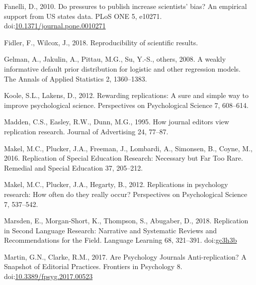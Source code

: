 \documentclass[]{elsarticle} %
\newlength{\cslhangindent}
\newlength{\cslentryspacingunit} %
\newenvironment{CSLReferences}[2] %
 {%
  \setlength{\parindent}{0pt}
  \ifodd #1
  \let\oldpar\par
  \def\par{\hangindent=\cslhangindent\oldpar}
  \fi
  \setlength{\parskip}{#2\cslentryspacingunit}
 }%
 {}
\begin{document}
\begin{CSLReferences}{1}{0}
\leavevmode{}%
Fanelli, D., 2010. Do pressures to publish increase scientists' bias? An
empirical support from US states data. PLoS ONE 5, e10271.
doi:\href{https://doi.org/10.1371/journal.pone.0010271}{10.1371/journal.pone.0010271}

\leavevmode{}%
Fidler, F., Wilcox, J., 2018. Reproducibility of scientific results.

\leavevmode{}%
Gelman, A., Jakulin, A., Pittau, M.G., Su, Y.-S., others, 2008. A weakly
informative default prior distribution for logistic and other regression
models. The Annals of Applied Statistics 2, 1360--1383.

\leavevmode{}%
Koole, S.L., Lakens, D., 2012. Rewarding replications: {A} sure and
simple way to improve psychological science. Perspectives on
Psychological Science 7, 608--614.

\leavevmode{}%
Madden, C.S., Easley, R.W., Dunn, M.G., 1995. How journal editors view
replication research. Journal of Advertising 24, 77--87.

\leavevmode{}%
Makel, M.C., Plucker, J.A., Freeman, J., Lombardi, A., Simonsen, B.,
Coyne, M., 2016. Replication of {Special} {Education} {Research}:
{Necessary} but {Far} {Too} {Rare}. Remedial and Special Education 37,
205--212.

\leavevmode{}%
Makel, M.C., Plucker, J.A., Hegarty, B., 2012. Replications in
psychology research: {How} often do they really occur? Perspectives on
Psychological Science 7, 537--542.

\leavevmode{}%
Marsden, E., Morgan‐Short, K., Thompson, S., Abugaber, D., 2018.
Replication in {Second} {Language} {Research}: {Narrative} and
{Systematic} {Reviews} and {Recommendations} for the {Field}. Language
Learning 68, 321--391. doi:\href{https://doi.org/gc3h3b}{gc3h3b}

\leavevmode{}%
Martin, G.N., Clarke, R.M., 2017. Are {Psychology} {Journals}
{Anti}-replication? {A} {Snapshot} of {Editorial} {Practices}. Frontiers
in Psychology 8.
doi:\href{https://doi.org/10.3389/fpsyg.2017.00523}{10.3389/fpsyg.2017.00523}


\end{CSLReferences}
\end{document}
